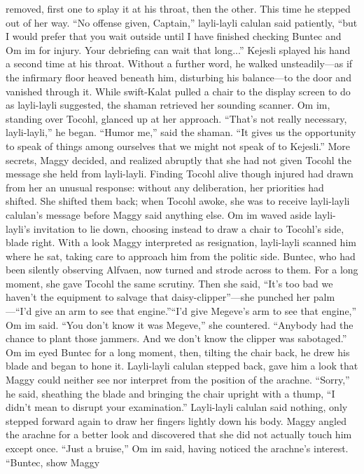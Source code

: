 \documentclass[9pt]{article}
\begin{document}
removed, first one to splay it at his throat, then the other. This time he stepped out of her way.
“No offense given, Captain,” layli-layli calulan said patiently, “but I would prefer that you wait
outside until I have finished checking Buntec and Om im for injury. Your debriefing can wait that long...”
Kejesli splayed his hand a second time at his throat. Without a further word, he walked
unsteadily—as if the infirmary floor heaved beneath him, disturbing his balance—to the door and
vanished through it.
While swift-Kalat pulled a chair to the display screen to do as layli-layli suggested, the shaman
retrieved her sounding scanner. Om im, standing over Tocohl, glanced up at her approach. “That’s not
really necessary, layli-layli,” he began.
“Humor me,” said the shaman. “It gives us the opportunity to speak of things among ourselves that
we might not speak of to Kejesli.”
More secrets, Maggy decided, and realized abruptly that she had not given Tocohl the message she
held from layli-layli. Finding Tocohl alive though injured had drawn from her an unusual response:
without any deliberation, her priorities had shifted. She shifted them back; when Tocohl awoke, she was
to receive layli-layli calulan’s message before Maggy said anything else.
Om im waved aside layli-layli’s invitation to lie down, choosing instead to draw a chair to Tocohl’s
side, blade right. With a look Maggy interpreted as resignation, layli-layli scanned him where he sat,
taking care to approach him from the politic side.
Buntec, who had been silently observing Alfvaen, now turned and strode across to them. For a long
moment, she gave Tocohl the same scrutiny. Then she said, “It’s too bad we haven’t the equipment to
salvage that daisy-clipper”—she punched her palm—“I’d give an arm to see that engine.”“I’d give Megeve’s arm to see that engine,” Om im said.
“You don’t know it was Megeve,” she countered. “Anybody had the chance to plant those jammers.
And we don’t know the clipper was sabotaged.”
Om im eyed Buntec for a long moment, then, tilting the chair back, he drew his blade and began to
hone it. Layli-layli calulan stepped back, gave him a look that Maggy could neither see nor interpret
from the position of the arachne. “Sorry,” he said, sheathing the blade and bringing the chair upright with
a thump, “I didn’t mean to disrupt your examination.”
Layli-layli calulan said nothing, only stepped forward again to draw her fingers lightly down his
body. Maggy angled the arachne for a better look and discovered that she did not actually touch him
except once. “Just a bruise,” Om im said, having noticed the arachne’s interest. “Buntec, show Maggy
\end{document}
